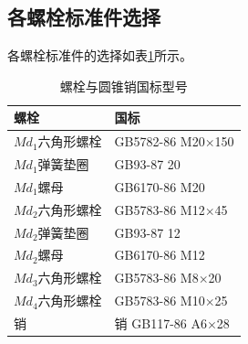 \documentclass[12pt]{ctexart}
\begin{document}
\subsection{各螺栓标准件选择}

各螺栓标准件的选择如表\ref{table23}所示。

\begin{table}[htbp]
    \centering
    \setlength{\belowcaptionskip}{0.3cm}
    \caption{螺栓与圆锥销国标型号}
    \begin{tabular}{l l}
        \toprule
        螺栓  &  国标 \\
        \midrule
        
        $Md_1$六角形螺栓 & GB5782-86 M20$\times $150  \\
        $Md_1$弹簧垫圈 & GB93-87 20\\
        $Md_1$螺母  & GB6170-86 M20\\
        $Md_2$六角形螺栓 & GB5783-86 M12$\times $45\\
        $Md_2$弹簧垫圈 & GB93-87 12\\
        $Md_2$螺母  & GB6170-86 M12\\
        $Md_3$六角形螺栓 & GB5783-86 M8$\times$20\\
        $Md_4$六角形螺栓 & GB5783-86 M10$\times$25\\
        销 & 销 GB117-86 A6$\times$28  \\
        \bottomrule
    \end{tabular}
    
    \label{table23}
\end{table}
\end{document}
